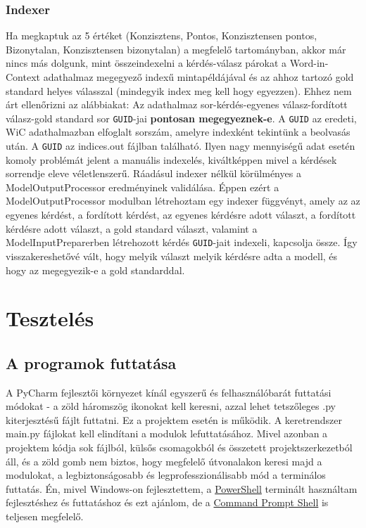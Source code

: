 \documentclass[12pt]{report}
\begin{document}
     \subsubsection{Indexer}
    Ha megkaptuk az 5 értéket (Konzisztens, Pontos, Konzisztensen pontos, Bizonytalan, Konzisztensen bizonytalan) a megfelelő tartományban, akkor már nincs más dolgunk, mint összeindexelni a kérdés-válasz párokat a Word-in-Context adathalmaz megegyező indexű mintapéldájával és az ahhoz tartozó gold standard helyes válasszal (mindegyik index meg kell hogy egyezzen). Ehhez nem árt ellenőrizni az alábbiakat:
    Az {adathalmaz sor-kérdés-egyenes válasz-fordított válasz-gold standard sor} \texttt{\allowbreak GUID}-jai \textbf{pontosan megegyeznek-e}. A \texttt{\allowbreak GUID} az eredeti, WiC adathalmazban elfoglalt sorszám, amelyre indexként tekintünk a beolvasás után. A \texttt{\allowbreak GUID} az indices.out fájlban található.
    Ilyen nagy mennyiségű adat esetén komoly problémát jelent a manuális indexelés, kiváltképpen mivel a kérdések sorrendje eleve véletlenszerű.
    Ráadásul indexer nélkül körülményes a ModelOutputProcessor eredményinek validálása.
    Éppen ezért a ModelOutputProcessor modulban létrehoztam egy indexer függvényt, amely az az egyenes kérdést, a fordított kérdést, az egyenes kérdésre adott választ, a fordított kérdésre adott választ, a gold standard választ, valamint a ModelInputPreparerben létrehozott kérdés \texttt{\allowbreak GUID}-jait indexeli, kapcsolja össze.
    Így visszakereshetővé vált, hogy melyik választ melyik kérdésre adta a modell, és hogy az megegyezik-e a gold standarddal.

    
    \section{Tesztelés}

    \subsection{A programok futtatása}
    A PyCharm fejlesztői környezet kínál egyszerű és felhasználóbarát futtatási módokat - a zöld háromszög ikonokat kell keresni, azzal lehet tetszőleges .py kiterjesztésű fájlt futtatni.
    Ez a projektem esetén is működik.
    A keretrendszer main.py fájlokat kell elindítani a modulok lefuttatásához.
    Mivel azonban a projektem kódja sok fájlból, külsős csomagokból és összetett projektszerkezetból áll, és a zöld gomb nem biztos, hogy megfelelő útvonalakon keresi majd a modulokat, a legbiztonságosabb és legprofesszionálisabb mód a terminálos futtatás. Én, mivel Windows-on fejlesztettem, a \href{https://learn.microsoft.com/en-us/powershell/}{PowerShell} terminált használtam fejlesztéshez és futtatáshoz és ezt ajánlom, de a \href{https://learn.microsoft.com/en-us/windows-server/administration/windows-commands/windows-commands}{Command Prompt Shell} is teljesen megfelelő.
\end{document}
